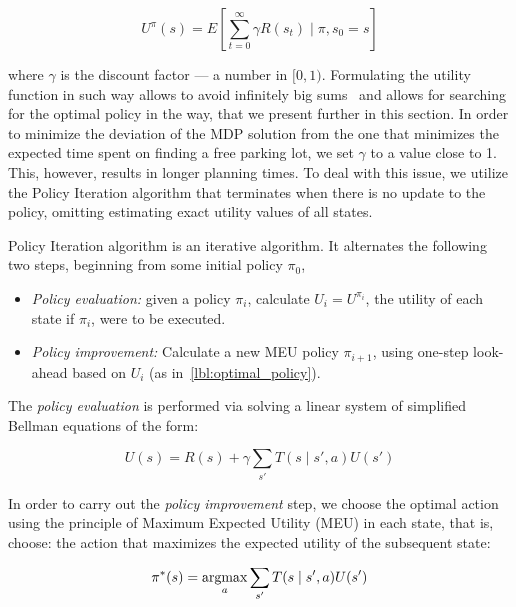 \begin{equation}
\label{eq:discount_utility}
U^{\pi}(s) = E\left[\sum_{t=0}^{\infty} \gamma R(s_t) \mid \pi,s_0 = s \right]
\end{equation}

where $\gamma$ is the discount factor --- a number in $[0, 1)$. Formulating
the utility function in such way allows to avoid infinitely big
sums~\cite{Russell:2003:AIM:773294} and allows for searching for the optimal
policy in the way, that we present further in this section. In order to
minimize the deviation of the MDP solution from the one that minimizes the
expected time spent on finding a free parking lot, we set $\gamma$ to a value
close to 1. This, however, results in longer planning times. To deal with this
issue, we utilize the Policy Iteration algorithm that terminates when there is
no update to the policy, omitting estimating exact utility values of all
states.

Policy Iteration algorithm is an iterative algorithm. It alternates the
following two steps, beginning from some initial policy $\pi_0$,

\begin{itemize}
    \item \emph{Policy evaluation:} given a policy $\pi_i$,
    calculate $U_i = U^{\pi_i}$, the utility of each state if $\pi_i$, were to be
    executed.
    \item \emph{Policy improvement:} Calculate a new MEU policy $\pi_{i+1}$, using one-step look-ahead based on
    $U_i$ (as in~\eqref{lbl:optimal_policy}).
\end{itemize}

The \emph{policy evaluation} is performed via solving a linear system of simplified Bellman equations of the form:

\begin{equation}
\label{lbl:bellman_equation}
U(s) = R(s) + \gamma \sum_{s'}T(s \mid s', a)U(s')
\end{equation}

In order to carry out the \emph{policy improvement} step, we choose the
optimal action using the principle of Maximum Expected Utility (MEU) in each
state, that is, choose: the action that maximizes the expected utility of the
subsequent state:

\begin{equation}
\label{lbl:optimal_policy}
\pi^*(s) = \mathop{\rm argmax}_a \sum_{s'} T(s \mid s', a)U(s')
\end{equation}

